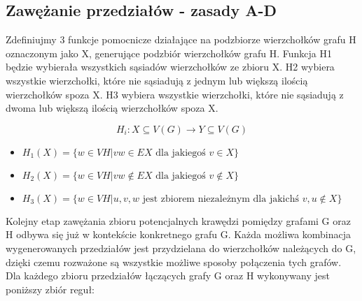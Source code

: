 \documentclass[11pt]{article}
\begin{document}
\subsection{Zawężanie przedziałów - zasady A-D}
Zdefiniujmy 3 funkcje pomocnicze działające na podzbiorze wierzchołków grafu H oznaczonym jako X, generujące podzbiór wierzchołków grafu H. 
Funkcja H1 będzie wybierała wszystkich sąsiadów wierzchołków ze zbioru X.
H2 wybiera wszystkie wierzchołki, które nie sąsiadują z jednym lub większą ilością wierzchołków spoza X. 
H3 wybiera wszystkie wierzchołki, które nie sąsiadują z dwoma lub większą ilością wierzchołków spoza X.

$$H_i: X \subseteq V(G) \to Y \subseteq V(G)$$

\begin{itemize}
    
  \item   $H_1(X) = \{ w \in VH | vw \in EX \textrm{ dla jakiegoś } v \in X \}$ 
  
  \item   $H_2(X) = \{ w \in VH | vw \notin EX \textrm{ dla jakiegoś } v \notin X\}$
  
  \item   $H_3(X) = \{ w \in VH | { u, v, w } \textrm{ jest zbiorem niezależnym dla jakichś } v, u \notin X\}$ 
\end{itemize}
Kolejny etap zawężania zbioru potencjalnych krawędzi pomiędzy grafami G oraz H odbywa się już w kontekście konkretnego grafu G. Każda możliwa kombinacja wygenerowanych przedziałów jest  przydzielana do wierzchołków należących do G, dzięki czemu rozważone są wszystkie możliwe sposoby połączenia tych grafów. Dla każdego zbioru przedziałów łączących grafy G oraz H wykonywany jest poniższy zbiór reguł:
\end{document}
